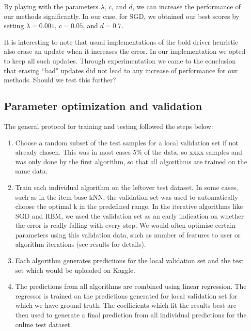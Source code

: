 \documentclass[10pt,conference,compsocconf]{IEEEtran}
\begin{document}
By playing with the parameters $\lambda$, $c$, and $d$, we can increase the performance of our methods significantly. In our case, for SGD, we obtained our best scores by setting $\lambda=0.001$, $c=0.05$, and $d=0.7$.

It is interesting to note that usual implementations of the bold driver heuristic also erase an update when it increases the error. In our implementation we opted to keep all such updates. Through experimentation we came to the conclusion that erasing ``bad" updates did not lead to any increase of performance for our methods. {\color{red} Should we test this further?}

\subsection{Parameter optimization and validation} 
The general protocol for training and testing followed the steps below:

\begin{enumerate}
\item Choose a random subset of the test samples for a local validation set if not already chosen. This was in most cases 5\% of the data, so xxxx samples and was only done by the first algorithm, so that all algorithms are trained on the same data.

\item Train each individual algorithm on the leftover test dataset. In some cases, such as in the item-base kNN, the validation set was used to automatically choose the optimal k in the predefined range. In the iterative algorithms like SGD and RBM, we used the validation set as an early indication on whether the error is really falling with every step. We would often optimise certain parameters using this validation data, such as number of features to user or algorithm iterations (see results for details).

\item Each algorithm generates predictions for the local validation set and the test set which would be uploaded on Kaggle.

\item The predictions from all algorithms are combined using linear regression. The regressor is trained on the predictions generated for local validation set for which we have ground truth. The coefficients which fit the results best are then used to generate a final prediction from all individual predictions for the online test dataset.

\end{enumerate}
\end{document}

